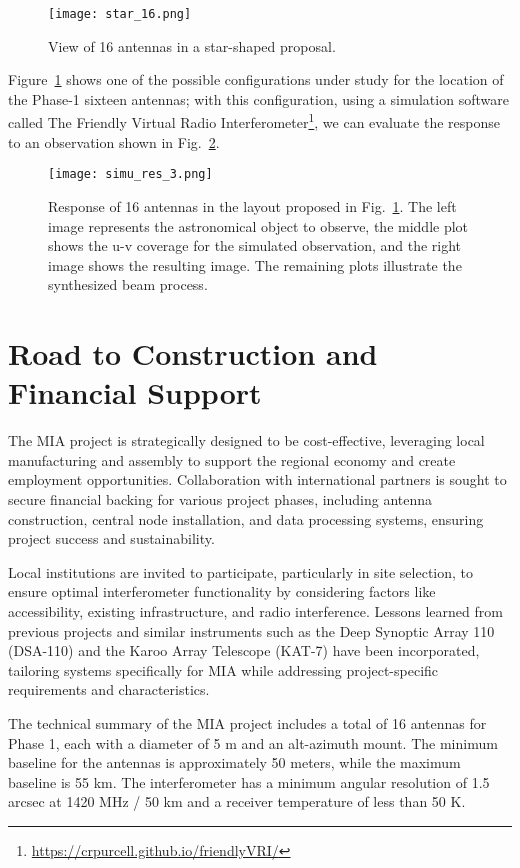 \documentclass[baaa]{baaa}
\begin{document}
\begin{figure}[!t]
  \texttt{[image: star\_16.png]}
  \caption{{View of 16 antennas in a star-shaped proposal.}}
  \label{fig:16-ant}
\end{figure}

Figure~\ref{fig:16-ant} shows one of the possible configurations under study for the location of the Phase-1 sixteen antennas; with this configuration, using a simulation software called The Friendly Virtual Radio Interferometer\footnote{\url{https://crpurcell.github.io/friendlyVRI/}}, we can evaluate the response to an observation shown in Fig.~\ref{fig:sim16}.

\begin{figure}[!t]
  \texttt{[image: simu\_res\_3.png]}
  \caption{{Response of 16 antennas in the layout proposed in Fig.~\ref{fig:16-ant}. The left image represents the astronomical object to observe, the middle plot shows the u-v coverage for the simulated observation, and the right image shows the resulting image. The remaining plots illustrate the synthesized beam process.}}
  \label{fig:sim16}
\end{figure}


\section{Road to Construction and Financial Support}
\label{sec:construction}

The MIA project is strategically designed to be cost-effective, leveraging local manufacturing and assembly to support the regional economy and create employment opportunities. Collaboration with international partners is sought to secure financial backing for various project phases, including antenna construction, central node installation, and data processing systems, ensuring project success and sustainability.

Local institutions are invited to participate, particularly in site selection, to ensure optimal interferometer functionality by considering factors like accessibility, existing infrastructure, and radio interference. Lessons learned from previous projects and similar instruments such as the Deep Synoptic Array 110 (DSA-110) and the Karoo Array Telescope (KAT-7) have been incorporated, tailoring systems specifically for MIA while addressing project-specific requirements and characteristics.

The technical summary of the MIA project includes a total of 16 antennas for Phase 1, each with a diameter of 5 m and an alt-azimuth mount. The minimum baseline for the antennas is approximately 50 meters, while the maximum baseline is 55 km. The interferometer has a minimum angular resolution of 1.5 arcsec at 1420 MHz / 50 km and a receiver temperature of less than 50 K.
\end{document}
